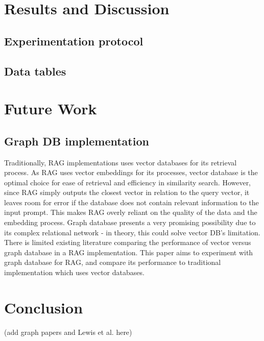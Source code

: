 \documentclass{scrartcl}
\begin{document}
\section{Results and Discussion}

\subsection{Experimentation protocol}

\subsection{Data tables}

\section{Future Work}

\subsection{Graph DB implementation}

Traditionally, RAG implementations uses vector databases for its retrieval process. As RAG uses vector embeddings for its processes, vector database is the optimal choice for ease of retrieval and efficiency in similarity search.
However, since RAG simply outputs the closest vector in relation to the query vector, it leaves room for error if the database does not contain relevant information to the input prompt. This makes RAG overly reliant on the quality of the data and the embedding process.
Graph database presents a very promising possibility due to its complex relational network - in theory, this could solve vector DB's limitation.
There is limited existing literature comparing the performance of vector versus graph database in a RAG implementation. This paper aims to experiment with graph database for RAG, and compare its performance to traditional implementation which uses vector databases.


\section{Conclusion}



(add graph papers and Lewis et al. here)
\end{document}
